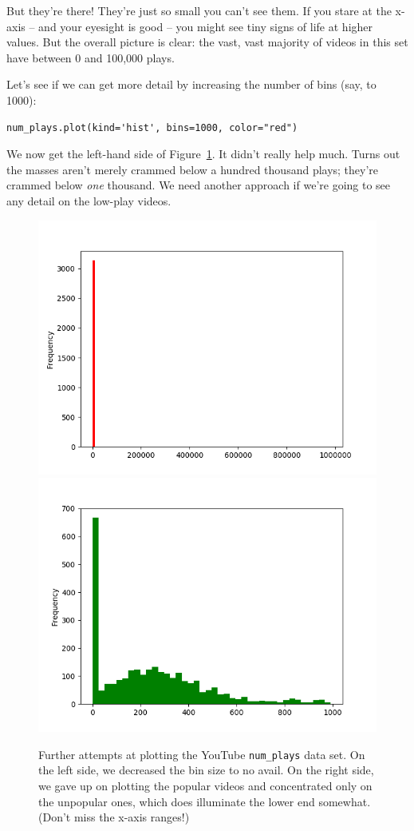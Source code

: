 But they're there! They're just so small you can't see them. If you stare at
the x-axis -- and your eyesight is good -- you might see tiny signs of life at
higher values. But the overall picture is clear: the vast, vast majority of
videos in this set have between 0 and 100,000 plays.


Let's see if we can get more detail by increasing the number of bins (say,
to 1000):

\begin{Verbatim}[fontsize=\scriptsize,samepage=true,frame=single,framesep=3mm]
num_plays.plot(kind='hist', bins=1000, color="red")
\end{Verbatim}

We now get the left-hand side of Figure~\ref{fig:youtube23}. It didn't really
help much. Turns out the masses aren't merely crammed below a hundred thousand
plays; they're crammed below \textit{one} thousand. We need another approach if
we're going to see any detail on the low-play videos.

\begin{figure}[ht]
\centering
\includegraphics[width=.48\textwidth]{youtube2.png}
\includegraphics[width=.48\textwidth]{youtube3.png}
\caption{Further attempts at plotting the YouTube \texttt{num\_plays} data set.
On the left side, we decreased the bin size to no avail. On the right side, we
gave up on plotting the popular videos and concentrated only on the unpopular
ones, which does illuminate the lower end somewhat. (Don't miss the x-axis
ranges!)}
\label{fig:youtube23}
\end{figure}


